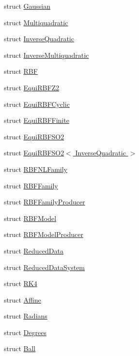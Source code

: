\begin{DoxyCompactItemize}
\item 
struct \hyperlink{struct_d_r_d_s_p_1_1_gaussian}{Gaussian}
\item 
struct \hyperlink{struct_d_r_d_s_p_1_1_multiquadratic}{Multiquadratic}
\item 
struct \hyperlink{struct_d_r_d_s_p_1_1_inverse_quadratic}{Inverse\-Quadratic}
\item 
struct \hyperlink{struct_d_r_d_s_p_1_1_inverse_multiquadratic}{Inverse\-Multiquadratic}
\item 
struct \hyperlink{struct_d_r_d_s_p_1_1_r_b_f}{R\-B\-F}
\item 
struct \hyperlink{struct_d_r_d_s_p_1_1_equi_r_b_f_z2}{Equi\-R\-B\-F\-Z2}
\item 
struct \hyperlink{struct_d_r_d_s_p_1_1_equi_r_b_f_cyclic}{Equi\-R\-B\-F\-Cyclic}
\item 
struct \hyperlink{struct_d_r_d_s_p_1_1_equi_r_b_f_finite}{Equi\-R\-B\-F\-Finite}
\item 
struct \hyperlink{struct_d_r_d_s_p_1_1_equi_r_b_f_s_o2}{Equi\-R\-B\-F\-S\-O2}
\item 
struct \hyperlink{struct_d_r_d_s_p_1_1_equi_r_b_f_s_o2_3_01_inverse_quadratic_01_4}{Equi\-R\-B\-F\-S\-O2$<$ Inverse\-Quadratic $>$}
\item 
struct \hyperlink{struct_d_r_d_s_p_1_1_r_b_f_n_l_family}{R\-B\-F\-N\-L\-Family}
\item 
struct \hyperlink{struct_d_r_d_s_p_1_1_r_b_f_family}{R\-B\-F\-Family}
\item 
struct \hyperlink{struct_d_r_d_s_p_1_1_r_b_f_family_producer}{R\-B\-F\-Family\-Producer}
\item 
struct \hyperlink{struct_d_r_d_s_p_1_1_r_b_f_model}{R\-B\-F\-Model}
\item 
struct \hyperlink{struct_d_r_d_s_p_1_1_r_b_f_model_producer}{R\-B\-F\-Model\-Producer}
\item 
struct \hyperlink{struct_d_r_d_s_p_1_1_reduced_data}{Reduced\-Data}
\item 
struct \hyperlink{struct_d_r_d_s_p_1_1_reduced_data_system}{Reduced\-Data\-System}
\item 
struct \hyperlink{struct_d_r_d_s_p_1_1_r_k4}{R\-K4}
\item 
struct \hyperlink{struct_d_r_d_s_p_1_1_affine}{Affine}
\item 
struct \hyperlink{struct_d_r_d_s_p_1_1_radians}{Radians}
\item 
struct \hyperlink{struct_d_r_d_s_p_1_1_degrees}{Degrees}
\item 
struct \hyperlink{struct_d_r_d_s_p_1_1_ball}{Ball}

\end{DoxyCompactItemize}
